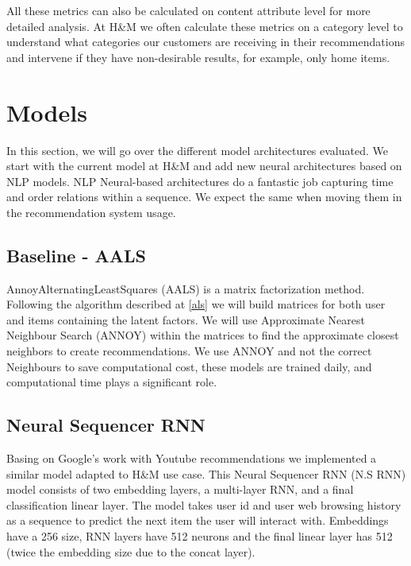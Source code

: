 \documentclass{kththesis}
\begin{document}
All these metrics can also be calculated on content attribute level for more detailed analysis. At H\&M we often calculate these metrics on a category level to understand what categories our customers are receiving in their recommendations and intervene if they have non-desirable results, for example, only home items. 


\chapter{Models}
In this section, we will go over the different model architectures evaluated. We start with the current model at H\&M and add new neural architectures based on NLP models. NLP Neural-based architectures do a fantastic job capturing time and order relations within a sequence. We expect the same when moving them in the recommendation system usage.

\section{Baseline - AALS}
AnnoyAlternatingLeastSquares (AALS) is a matrix factorization method. Following the algorithm described at \ref{als} we will build matrices for both user and items containing the latent factors. We will use Approximate Nearest Neighbour Search \cite{annoy} (ANNOY) within the matrices to find the approximate closest neighbors to create recommendations. We use ANNOY and not the correct Neighbours to save computational cost, these models are trained daily, and computational time plays a significant role.


\section{Neural Sequencer RNN}
Basing on Google's work with Youtube recommendations \cite{rnn-youtube} we implemented a similar model adapted to H\&M use case. This Neural Sequencer RNN (N.S RNN) model consists of two embedding layers, a multi-layer RNN, and a final classification linear layer. The model takes user id and user web browsing history as a sequence to predict the next item the user will interact with. Embeddings have a 256 size, RNN layers have 512 neurons and the final linear layer has 512 (twice the embedding size due to the concat layer). 
\end{document}
